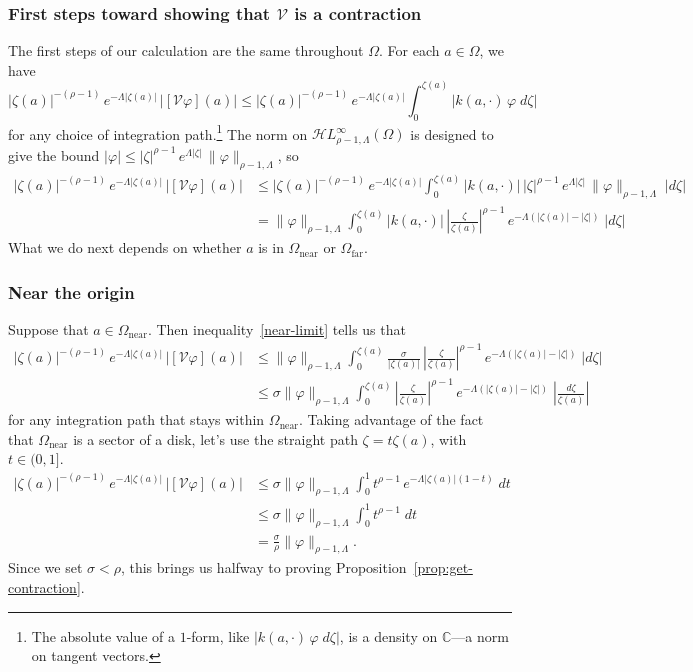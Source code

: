 \documentclass{article}
\theoremstyle{plain}
\newcommand{\C}{\mathbb{C}}
\newcommand{\singexp}[2]{\mathcal{H}L^\infty_{#1, #2}}
\newcommand{\volterra}{\mathcal{V}}
\newcommand{\domain}{\Omega}
\newcommand{\near}{\Omega_\text{near}}
\newcommand{\far}{\Omega_\text{far}}
\begin{document}
\subsubsection{First steps toward showing that $\volterra$ is a contraction}\label{first-steps}
The first steps of our calculation are the same throughout $\domain$. For each $a \in \domain$, we have
\[ |\zeta(a)|^{-(\rho-1)}\,e^{-\Lambda|\zeta(a)|}\,|[\volterra\varphi](a)| \le |\zeta(a)|^{-(\rho-1)}\,e^{-\Lambda|\zeta(a)|} \int_0^{\zeta(a)} |k(a, \cdot)\,\varphi\;d\zeta| \]
for any choice of integration path.\footnote{The absolute value of a $1$-form, like $|k(a, \cdot)\,\varphi\;d\zeta|$, is a density on $\C$---a norm on tangent vectors.} The norm on $\singexp{\rho-1}{\Lambda}(\domain)$ is designed to give the bound $|\varphi| \le |\zeta|^{\rho-1}\,e^{\Lambda |\zeta|}\,\|\varphi\|_{\rho-1, \Lambda}$, so
\begin{align*}
|\zeta(a)|^{-(\rho-1)}\,e^{-\Lambda|\zeta(a)|}\,|[\volterra\varphi](a)| & \le |\zeta(a)|^{-(\rho-1)}\,e^{-\Lambda|\zeta(a)|} \int_0^{\zeta(a)} |k(a, \cdot)|\,|\zeta|^{\rho-1}\,e^{\Lambda |\zeta|}\,\|\varphi\|_{\rho-1, \Lambda}\;|d\zeta| \\
& = \|\varphi\|_{\rho-1, \Lambda} \int_0^{\zeta(a)} |k(a, \cdot)|\,\left|\frac{\zeta}{\zeta(a)}\right|^{\rho-1}\,e^{-\Lambda(|\zeta(a)| - |\zeta|)}\;|d\zeta|
\end{align*}
What we do next depends on whether $a$ is in $\near$ or $\far$.
\subsubsection{Near the origin}\label{near-bound}
Suppose that $a \in \near$. Then inequality~\eqref{near-limit} tells us that
\begin{align*}
|\zeta(a)|^{-(\rho-1)}\,e^{-\Lambda|\zeta(a)|}\,|[\volterra\varphi](a)| & \le
\|\varphi\|_{\rho-1, \Lambda} \int_0^{\zeta(a)} \frac{\sigma}{|\zeta(a)|}\,\left|\frac{\zeta}{\zeta(a)}\right|^{\rho-1}\,e^{-\Lambda(|\zeta(a)| - |\zeta|)}\;|d\zeta| \\
& \le \sigma \|\varphi\|_{\rho-1, \Lambda} \int_0^{\zeta(a)} \left|\frac{\zeta}{\zeta(a)}\right|^{\rho-1}\,e^{-\Lambda(|\zeta(a)| - |\zeta|)}\;\left|\frac{d\zeta}{\zeta(a)}\right|
\end{align*}
for any integration path that stays within $\near$. Taking advantage of the fact that $\near$ is a sector of a disk, let's use the straight path $\zeta = t \zeta(a)$, with $t \in (0, 1]$.
\begin{align*}
|\zeta(a)|^{-(\rho-1)}\,e^{-\Lambda|\zeta(a)|}\,|[\volterra\varphi](a)| & \le \sigma \|\varphi\|_{\rho-1, \Lambda} \int_0^1 t^{\rho-1}\,e^{-\Lambda |\zeta(a)|(1 - t)}\;dt \\
& \le \sigma \|\varphi\|_{\rho-1, \Lambda} \int_0^1 t^{\rho-1}\;dt \\
& = \frac{\sigma}{\rho} \|\varphi\|_{\rho-1, \Lambda}.
\end{align*}
Since we set $\sigma < \rho$, this brings us halfway to proving Proposition~\ref{prop:get-contraction}.
\end{document}
